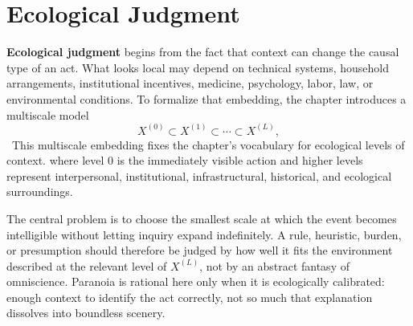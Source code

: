 
\chapter{Ecological Judgment}
\label{ch:ch014}

\textbf{Ecological judgment} begins from the fact that context can change the causal type of an act. What looks local may depend on technical systems, household arrangements, institutional incentives, medicine, psychology, labor, law, or environmental conditions. To formalize that embedding, the chapter introduces a multiscale model
\[
X^{(0)}\subset X^{(1)}\subset\cdots\subset X^{(L)},
\]
\Definition\ This multiscale embedding fixes the chapter's vocabulary for ecological levels of context.
where level \(0\) is the immediately visible action and higher levels represent interpersonal, institutional, infrastructural, historical, and ecological surroundings.

The central problem is to choose the smallest scale at which the event becomes intelligible without letting inquiry expand indefinitely. A rule, heuristic, burden, or presumption should therefore be judged by how well it fits the environment described at the relevant level of \(X^{(L)}\), not by an abstract fantasy of omniscience. Paranoia is rational here only when it is ecologically calibrated: enough context to identify the act correctly, not so much that explanation dissolves into boundless scenery.
